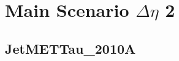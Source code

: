 \documentclass[11pt]{book}
\begin{document}
\clearpage
\chapter{Main Scenario $\Delta\eta$ 2 }
\section{JetMETTau\_2010A}

\begin{comment}
\subsection{Pythia 6 Z2* Response Matrix}

\begin{figure}[ht]
\centering
\texttt{[image: ../output/check\_response/png/pythia6\_z2\_jetmettau\_delta\_phi\_deta2\_response.png]}
\caption{$\Delta\phi$ main scenario deta2 JetMETTau\_2010A - Pythia 6 Z2* response matrix}
\label{p6_jetmettau_delta_phi_deta2_response}
\end{figure}

\begin{figure}[ht]
\centering
\texttt{[image: ../output/check\_response/png/pythia6\_z2\_jetmettau\_delta\_phi\_deta2\_response\_norm.png]}
\caption{$\Delta\phi$ main scenario deta2 JetMETTau\_2010A - Pythia 6 Z2* response matrix normalized}
\label{p6_jetmettau_delta_phi_deta2_response_norm}
\end{figure}

\begin{figure}[ht]
\centering
\texttt{[image: ../output/check\_response/png/pythia6\_z2\_jetmettau\_delta\_phi\_deta2\_response\_all.png]}
\caption{$\Delta\phi$ main scenario deta2 JetMETTau\_2010A - Pythia 6 Z2* response matrix with fakes and miss}
\label{p6_jetmettau_delta_phi_deta2_response_all}
\end{figure}

\begin{figure}[ht]
\centering
\texttt{[image: ../output/check\_response/png/pythia6\_z2\_jetmettau\_delta\_phi\_deta2\_response\_all\_norm.png]}
\caption{$\Delta\phi$ main scenario deta2 JetMETTau\_2010A - Pythia 6 Z2* response matrix with fakes and miss normalized}
\label{p6_jetmettau_delta_phi_deta2_response_all_norm}
\end{figure}

\begin{figure}[ht]
\centering
\texttt{[image: ../output/check\_response/png/pythia6\_z2\_jetmettau\_delta\_phi\_deta2\_fakes.png]}
\texttt{[image: ../output/check\_response/png/pythia6\_z2\_jetmettau\_delta\_phi\_deta2\_miss.png]}
\caption{$\Delta\phi$ main scenario deta2 JetMETTau\_2010A - Pythia 6 Z2* fakes and miss distributions}
\label{p6_jetmettau_delta_phi_deta2_fakesmiss}
\end{figure}



\end{comment}
\end{document}
